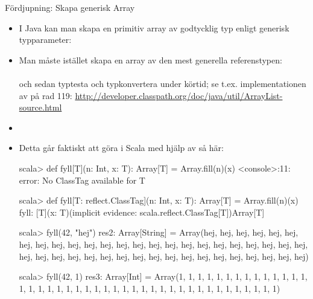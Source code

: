 \begin{Slide}{Fördjupning: Skapa generisk Array}\SlideFontTiny
\begin{itemize}
\item I Java kan man  skapa en primitiv array av godtycklig typ enligt generisk typparameter: \sout{}

\item Man måste istället skapa en array av den mest generella referenstypen: \\
 \\
och sedan typtesta och typkonvertera under körtid; se t.ex. implementationen av  på rad 119: \href{http://developer.classpath.org/doc/java/util/ArrayList-source.html}{http://developer.classpath.org/doc/java/util/ArrayList-source.html}

\item[]
\pause
\item Detta går faktiskt att göra i Scala med hjälp av  \pause så här: \\
\begin{REPLnonum}[basicstyle=\ttfamily\SlideFontSize{6}{8}\color{white}]
scala> def fyll[T](n: Int, x: T): Array[T] = Array.fill(n)(x)
<console>:11: error: No ClassTag available for T

scala> def fyll[T: reflect.ClassTag](n: Int, x: T): Array[T] = Array.fill(n)(x)
fyll: [T](x: T)(implicit evidence: scala.reflect.ClassTag[T])Array[T]

scala> fyll(42, "hej")
res2: Array[String] = Array(hej, hej, hej, hej, hej, hej, hej, hej, hej, hej, hej, hej, hej, hej, hej, hej, hej, hej, hej, hej, hej, hej, hej, hej, hej, hej, hej, hej, hej, hej, hej, hej, hej, hej, hej, hej, hej, hej, hej, hej, hej, hej)

scala> fyll(42, 1)
res3: Array[Int] = Array(1, 1, 1, 1, 1, 1, 1, 1, 1, 1, 1, 1, 1, 1, 1, 1, 1, 1, 1, 1, 1, 1, 1, 1, 1, 1, 1, 1, 1, 1, 1, 1, 1, 1, 1, 1, 1, 1, 1, 1, 1, 1)

\end{REPLnonum}


\end{itemize}


\end{Slide}

